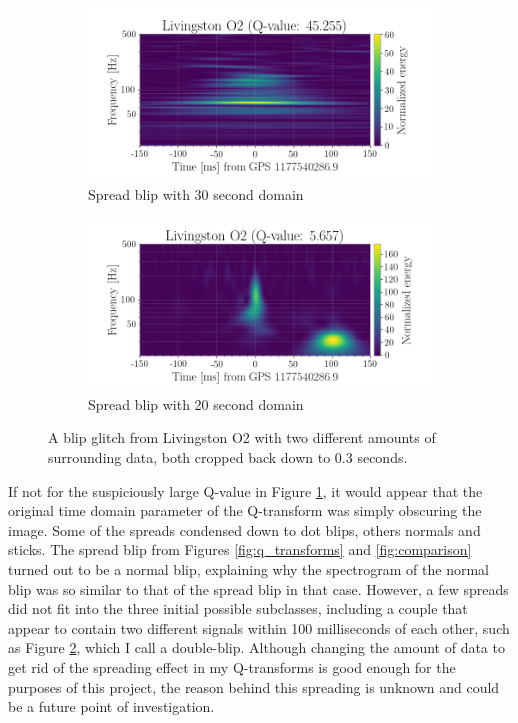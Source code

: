 \documentclass[a4paper]{article}
\begin{document}
\begin{figure}[h!]
	\centering
	\begin{subfigure}{.49\textwidth}
		\centering
		\includegraphics[width=1\linewidth]{spread_ex_30s}
		\caption{Spread blip with 30 second domain}
		\label{fig:spread_30}
	\end{subfigure}
	\begin{subfigure}{.49\textwidth}
		\centering
		\includegraphics[width=1\linewidth]{spread_ex_20s}
		\caption{Spread blip with 20 second domain}
		\label{fig:spread_20}
	\end{subfigure}
	\caption{A blip glitch from Livingston O2 with two different amounts of surrounding data, both cropped back down to 0.3 seconds.}%
	\label{fig:spread_ex}
\end{figure}

If not for the suspiciously large Q-value in Figure \ref{fig:spread_30}, it would appear that the original time domain parameter of the Q-transform was simply obscuring the image. Some of the spreads condensed down to dot blips, others normals and sticks. The spread blip from Figures \ref{fig:q_transforms} and \ref{fig:comparison} turned out to be a normal blip, explaining why the spectrogram of the normal blip was so similar to that of the spread blip in that case. However, a few spreads did not fit into the three initial possible subclasses, including a couple that appear to contain two different signals within 100 milliseconds of each other, such as Figure \ref{fig:spread_20}, which I call a double-blip. Although changing the amount of data to get rid of the spreading effect in my Q-transforms is good enough for the purposes of this project, the reason behind this spreading is unknown and could be a future point of investigation.
\end{document}
